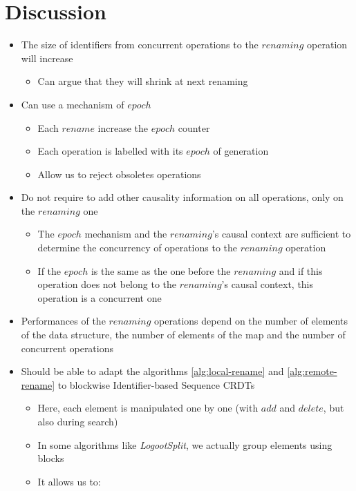 \documentclass[a4paper]{article}
\begin{document}
\section{Discussion}

\begin{itemize}
  \item The size of identifiers from concurrent operations to the $renaming$ operation will increase
  \begin{itemize}
    \item Can argue that they will shrink at next renaming
  \end{itemize}
  \item Can use a mechanism of $epoch$
  \begin{itemize}
    \item Each $rename$ increase the $epoch$ counter
    \item Each operation is labelled with its $epoch$ of generation
    \item Allow us to reject obsoletes operations
  \end{itemize}
  \item Do not require to add other causality information on all operations, only on the $renaming$ one
  \begin{itemize}
    \item The $epoch$ mechanism and the $renaming$'s causal context are sufficient
      to determine the concurrency of operations to the $renaming$ operation
    \item If the $epoch$ is the same as the one before the $renaming$
      and if this operation does not belong to the $renaming$'s causal context,
      this operation is a concurrent one
  \end{itemize}
  \item Performances of the $renaming$ operations depend on the number of elements
    of the data structure, the number of elements of the map
    and the number of concurrent operations
  \item Should be able to adapt the algorithms \ref{alg:local-rename} and \ref{alg:remote-rename}
    to blockwise Identifier-based Sequence \acp{CRDT}
  \begin{itemize}
    \item Here, each element is manipulated one by one (with $add$ and $delete$, but also during search)
    \item In some algorithms like \emph{LogootSplit},
      we actually group elements using blocks
    \item It allows us to:

\end{itemize}
\end{itemize}
\end{document}
